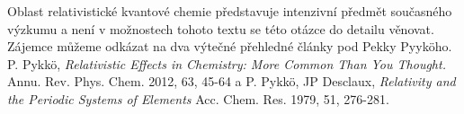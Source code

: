 Oblast relativistické kvantové chemie představuje intenzivní předmět současného výzkumu a není v možnostech tohoto textu se této otázce do detailu věnovat. Zájemce můžeme odkázat na dva výtečné přehledné články pod Pekky Pyyk\"oho. P. Pykk\"o, \textit{Relativistic Effects in Chemistry: More Common Than You Thought.} Annu. Rev. Phys. Chem. 2012, 63, 45-64 a P. Pykk\"o, JP Desclaux, \textit{Relativity and the Periodic Systems of Elements} Acc. Chem. Res. 1979, 51, 276-281. 



      

   




 




      

      



